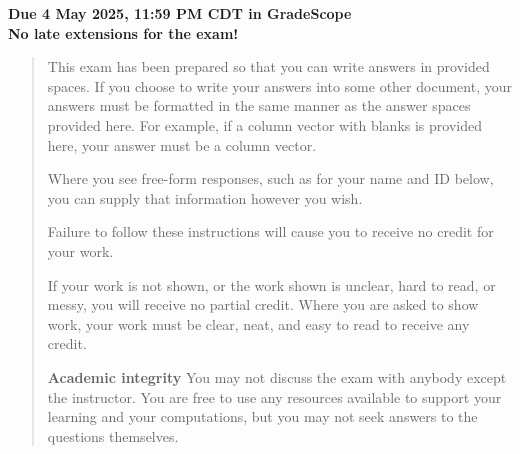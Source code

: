 \documentclass[12pt]{article}
\begin{document}

\begin{center}\bf
Due 4 May 2025, 11:59 PM CDT in GradeScope\\
No late extensions for the exam!
\end{center}
\begin{quote}
    This exam has been prepared so that you can write answers in provided spaces.  If you choose to write your answers into some other document, your answers must be formatted in the same manner as the answer spaces provided here. For example, if a column vector with blanks is provided here, your answer must be a column vector.

    Where you see free-form responses, such as for your name and ID below, you can supply that information however you wish.

    Failure to follow these instructions will cause you to receive no credit for your work.

    If your work is not shown, or the work shown is unclear, hard to read, or messy, you will receive no partial credit.   Where you are asked to show work, your work must be clear, neat, and easy to read to receive any credit.

    {\bf Academic integrity} You may not discuss the exam with anybody except the instructor. You are free to use any resources available to support your learning and your computations, but you may not seek answers to the questions themselves.
\end{quote}
\end{document}
